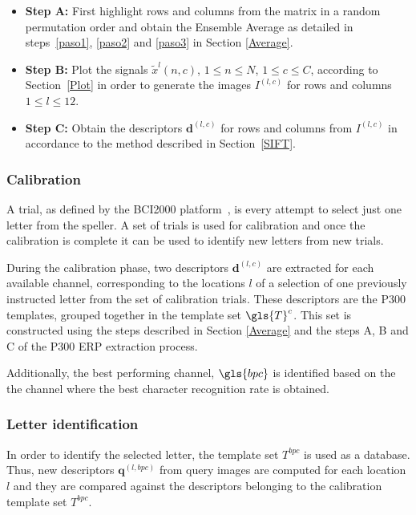 \begin{itemize}

\item \textbf{Step A:}\label{pasoa} First highlight rows and columns from the matrix in a random permutation order and obtain the Ensemble Average as detailed in steps~\ref{paso1}, \ref{paso2} and \ref{paso3} in Section \ref{Average}.
\item \textbf{Step B:}\label{paso4} Plot the signals $\tilde{x}^l(n,c)$,  $1 \leq n \leq N$, $1 \leq c \leq C $,  according to Section~\ref{Plot} in order to generate the images $I^{(l,c)}$ for rows and columns $1 \leq l \leq 12$.

\item \textbf{Step C:} Obtain the descriptors $ \mathbf{d}^{(l,c)}$ for rows and columns from $I^{(l,c)}$  in accordance to the method described in Section~\ref{SIFT}. 

\end{itemize}

\subsubsection{Calibration}

A trial, as defined by the BCI2000 platform~\cite{Schalk2004}, is every attempt to select just one letter from the speller.  A set of trials is used for calibration and once the calibration is complete it can be used to identify new letters from new trials.

During the calibration phase, two descriptors $ \mathbf{d}^{(l,c)}$ are extracted for each available channel, corresponding to the locations $l$ of a selection of one previously instructed letter from the set of calibration trials.  These descriptors are the P300 templates, grouped together in the template set $ \gls{T}^c $.   This set is constructed using the steps described in Section \ref{Average} and the steps A, B and C of the P300 ERP extraction process.

Additionally, the best performing channel, $\gls{bpc}$ is identified based on the the channel where the best character recognition rate is obtained.

\subsubsection{Letter identification}

In order to identify the selected letter, the template set $T^{bpc}$ is used as a database.  Thus, new descriptors $\mathbf{q}^{(l,bpc)} $ from query images are computed for each location $l$ and they are compared against the descriptors belonging to the calibration template set $T^{bpc}$.

